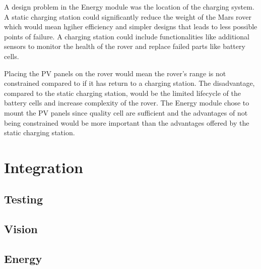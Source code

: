 \documentclass[11pt, a4paper]{article}
\begin{document}
A design problem in the Energy module was the location of the charging system. A static charging station could significantly reduce the weight of the Mars rover which would mean hgiher efficiency and simpler designs that leads to less possible points of failure. A charging station could include functionalities like additional sensors to monitor the health of the rover and replace failed parts like battery cells. 

Placing the PV panels on the rover would mean the rover's range is not constrained compared to if it has return to a charging station. The disadvantage, compared to the static charging station, would be the limited lifecycle of the battery cells and increase complexity of the rover. The Energy module chose to mount the PV panels since quality cell are sufficient and the advantages of not being constrained would be more important than the advantages offered by the static charging station.



\pagebreak
\section{Integration}

\subsection{Testing}

\subsection{Vision}

\subsection{Energy}







\pagebreak
\printbibliography[heading=bibnumbered, title={References}]
\end{document}
